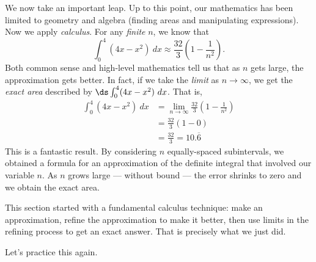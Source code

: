 We now take an important leap. Up to this point, our mathematics has been limited to geometry and algebra (finding areas and manipulating expressions). Now we apply \textit{calculus}. For any \textit{finite} $n$, we know that
\[\int_0^4 (4x-x^2)\ dx \approx \frac{32}{3}\left(1-\frac{1}{n^2}\right).\]
Both common sense and high-level mathematics tell us that as $n$ gets large, the approximation gets better. In fact, if we take the \textit{limit} as $n\rightarrow \infty$, we get the \textit{exact area} described by $\ds\int_0^4 (4x-x^2)\ dx$. That is, 
\begin{align*}
	\int_0^4 (4x-x^2)\ dx
	&= \lim_{n\to\infty} \frac{32}{3}\left(1-\frac{1}{n^2}\right) \\
	&= \frac{32}{3}\left(1-0\right)\\
	&= \frac{32}{3} = 10.\overline{6}
\end{align*}
This is a fantastic result. By considering $n$ equally-spaced subintervals, we obtained a formula for an approximation of the definite integral that involved our variable $n$. As $n$ grows large --- without bound --- the error shrinks to zero and we obtain the exact area.

This section started with a fundamental calculus technique: make an approximation, refine the approximation to make it better, then use limits in the refining process to get an exact answer. That is precisely what we just did.

Let's practice this again.

